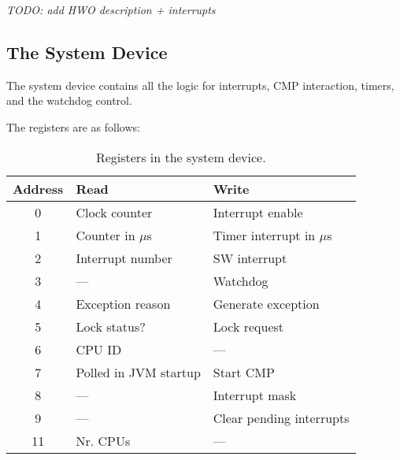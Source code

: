 
\emph{TODO: add HWO description + interrupts}

\subsection{The System Device}

The system device contains all the logic for interrupts, CMP
interaction, timers, and the watchdog control.

The registers are as follows:

\begin{table}
    \centering
    \begin{tabular}{cll}
        \toprule
        Address  & Read & Write \\
        \midrule
        0 & Clock counter & Interrupt enable \\
        1 & Counter in $\mu$s & Timer interrupt in $\mu$s \\
        2 & Interrupt number & SW interrupt \\
        3 & --- & Watchdog \\
        4 & Exception reason & Generate exception \\
        5 & Lock status? & Lock request \\
        6 & CPU ID & --- \\
        7 & Polled in JVM startup & Start CMP \\
        8 & --- & Interrupt mask \\
        9 & --- & Clear pending interrupts \\
        11 & Nr. CPUs & --- \\
        \bottomrule
    \end{tabular}
    \caption{Registers in the system device.}
    \label{tab:io:sysdev}
\end{table}
